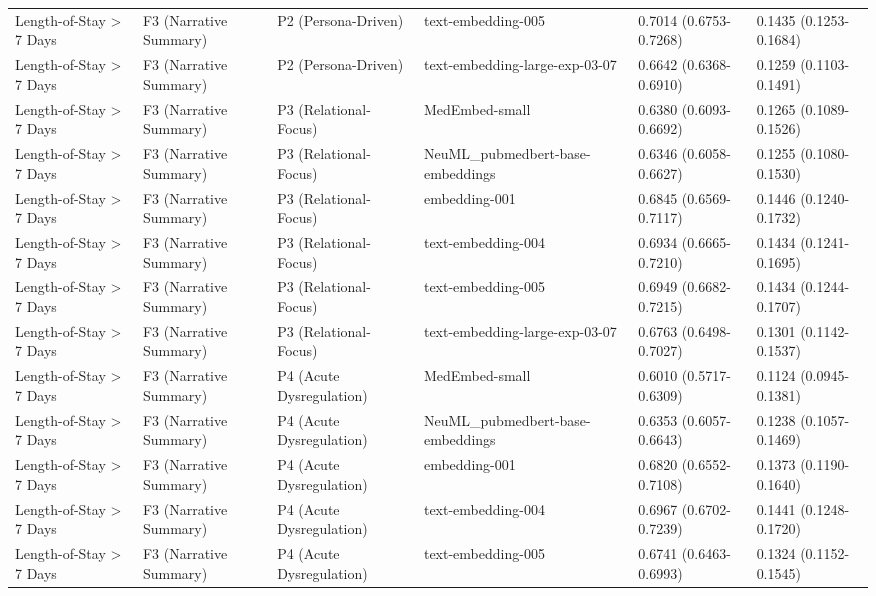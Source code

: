 \begin{tabular}{llllll}
Length-of-Stay \textgreater{} 7 Days & F3 (Narrative Summary) & P2 (Persona-Driven) & text-embedding-005 & 0.7014 (0.6753-0.7268) & 0.1435 (0.1253-0.1684) \\
Length-of-Stay \textgreater{} 7 Days & F3 (Narrative Summary) & P2 (Persona-Driven) & text-embedding-large-exp-03-07 & 0.6642 (0.6368-0.6910) & 0.1259 (0.1103-0.1491) \\
Length-of-Stay \textgreater{} 7 Days & F3 (Narrative Summary) & P3 (Relational-Focus) & MedEmbed-small & 0.6380 (0.6093-0.6692) & 0.1265 (0.1089-0.1526) \\
Length-of-Stay \textgreater{} 7 Days & F3 (Narrative Summary) & P3 (Relational-Focus) & NeuML\_pubmedbert-base-embeddings & 0.6346 (0.6058-0.6627) & 0.1255 (0.1080-0.1530) \\
Length-of-Stay \textgreater{} 7 Days & F3 (Narrative Summary) & P3 (Relational-Focus) & embedding-001 & 0.6845 (0.6569-0.7117) & 0.1446 (0.1240-0.1732) \\
Length-of-Stay \textgreater{} 7 Days & F3 (Narrative Summary) & P3 (Relational-Focus) & text-embedding-004 & 0.6934 (0.6665-0.7210) & 0.1434 (0.1241-0.1695) \\
Length-of-Stay \textgreater{} 7 Days & F3 (Narrative Summary) & P3 (Relational-Focus) & text-embedding-005 & 0.6949 (0.6682-0.7215) & 0.1434 (0.1244-0.1707) \\
Length-of-Stay \textgreater{} 7 Days & F3 (Narrative Summary) & P3 (Relational-Focus) & text-embedding-large-exp-03-07 & 0.6763 (0.6498-0.7027) & 0.1301 (0.1142-0.1537) \\
Length-of-Stay \textgreater{} 7 Days & F3 (Narrative Summary) & P4 (Acute Dysregulation) & MedEmbed-small & 0.6010 (0.5717-0.6309) & 0.1124 (0.0945-0.1381) \\
Length-of-Stay \textgreater{} 7 Days & F3 (Narrative Summary) & P4 (Acute Dysregulation) & NeuML\_pubmedbert-base-embeddings & 0.6353 (0.6057-0.6643) & 0.1238 (0.1057-0.1469) \\
Length-of-Stay \textgreater{} 7 Days & F3 (Narrative Summary) & P4 (Acute Dysregulation) & embedding-001 & 0.6820 (0.6552-0.7108) & 0.1373 (0.1190-0.1640) \\
Length-of-Stay \textgreater{} 7 Days & F3 (Narrative Summary) & P4 (Acute Dysregulation) & text-embedding-004 & 0.6967 (0.6702-0.7239) & 0.1441 (0.1248-0.1720) \\
Length-of-Stay \textgreater{} 7 Days & F3 (Narrative Summary) & P4 (Acute Dysregulation) & text-embedding-005 & 0.6741 (0.6463-0.6993) & 0.1324 (0.1152-0.1545) \\

\end{tabular}
